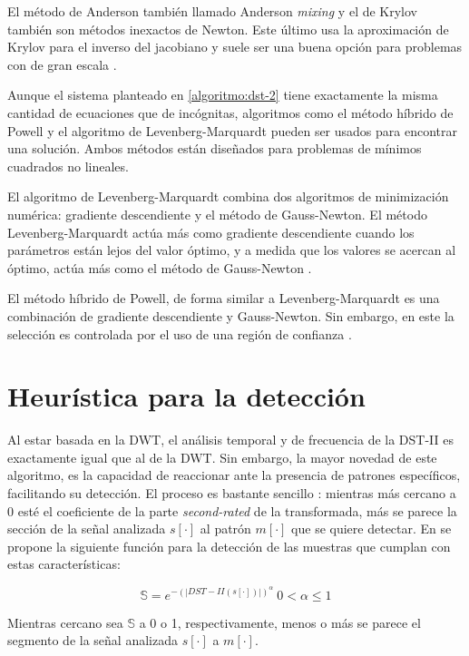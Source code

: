 El método de Anderson también llamado Anderson \textit{mixing} \cite{Eyert1996} y el de Krylov también son métodos inexactos de Newton. 
Este último usa la aproximación de Krylov para el inverso del jacobiano y suele ser una buena opción para problemas
con de gran escala \cite{kelley1995iterative}.

Aunque el sistema planteado en \ref{algoritmo:dst-2} tiene exactamente la misma cantidad de ecuaciones que de 
incógnitas, algoritmos como el método híbrido de Powell y el algoritmo de Levenberg-Marquardt pueden 
ser usados para encontrar una solución. Ambos métodos están diseñados para problemas de mínimos cuadrados no lineales.

El algoritmo de Levenberg-Marquardt combina dos algoritmos de minimización numérica:
gradiente descendiente y el método de Gauss-Newton. El método Levenberg-Marquardt actúa más como gradiente 
descendiente cuando los parámetros están lejos del valor óptimo, y a medida que los valores se acercan 
al óptimo, actúa más como el método de Gauss-Newton \cite{madsen2004methods}.

El método híbrido de Powell, de forma similar a Levenberg-Marquardt es una combinación de gradiente descendiente y Gauss-Newton.
Sin embargo, en este la selección es controlada por el uso de una región de confianza \cite{madsen2004methods}.

\section{Heurística para la detección}

Al estar basada en la DWT, el análisis temporal y de frecuencia de la DST-II es exactamente igual que al de la DWT.
Sin embargo, la mayor novedad de este algoritmo, es la capacidad de reaccionar ante la presencia de 
patrones específicos, facilitando su detección. El proceso es bastante sencillo :
mientras más cercano a $0$ esté el coeficiente de la parte \textit{second-rated} de la transformada, más se parece
la sección de la señal analizada $s[\cdot]$ al patrón $m[\cdot]$ que se quiere detectar. En \cite{Guido2018} se
propone la siguiente función para la detección de las muestras que cumplan con estas características:

\begin{equation}
	\mathbb{S} = e^{-{(|DST-II(s[\cdot])|)}^{\alpha}} \ 0 < \alpha \leq 1
\end{equation}\label{eq:s-heuristic}

Mientras cercano sea $\mathbb{S}$ a 0 o 1, respectivamente, menos o más se parece el segmento de
la señal analizada $s[\cdot]$ a $m[\cdot]$.

